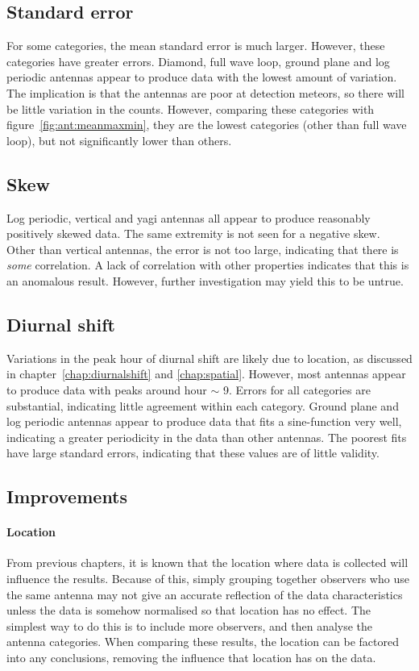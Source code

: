 \subsection{Standard error}
For some categories, the mean standard error is much larger. However, these categories have greater errors. Diamond, full wave loop, ground plane and log periodic antennas appear to produce data with the lowest amount of variation. The implication is that the antennas are poor at detection meteors, so there will be little variation in the counts. However, comparing these categories with figure~\ref{fig:ant:meanmaxmin}, they are the lowest categories (other than full wave loop), but not significantly lower than others. 
\subsection{Skew}
Log periodic, vertical and yagi antennas all appear to produce reasonably positively skewed data. The same extremity is not seen for a negative skew. Other than vertical antennas, the error is not too large, indicating that there is {\it some} correlation. A lack of correlation with other properties indicates that this is an anomalous result. However, further investigation may yield this to be untrue.
\subsection{Diurnal shift}
Variations in the peak hour of diurnal shift are likely due to location, as discussed in chapter~\ref{chap:diurnalshift} and \ref{chap:spatial}. However, most antennas appear to produce data with peaks around hour $\sim$ 9. Errors for all categories are substantial, indicating little agreement within each category. Ground plane and log periodic antennas appear to produce data that fits a sine-function very well, indicating a greater periodicity in the data than other antennas. The poorest fits have large standard errors, indicating that these values are of little validity.
\subsection{Improvements}
\paragraph{Location}
From previous chapters, it is known that the location where data is collected will influence the results. Because of this, simply grouping together observers who use the same antenna may not give an accurate reflection of the data characteristics unless the data is somehow normalised so that location has no effect. The simplest way to do this is to include more observers, and then analyse the antenna categories. When comparing these results, the location can be factored into any conclusions, removing the influence that location has on the data.
